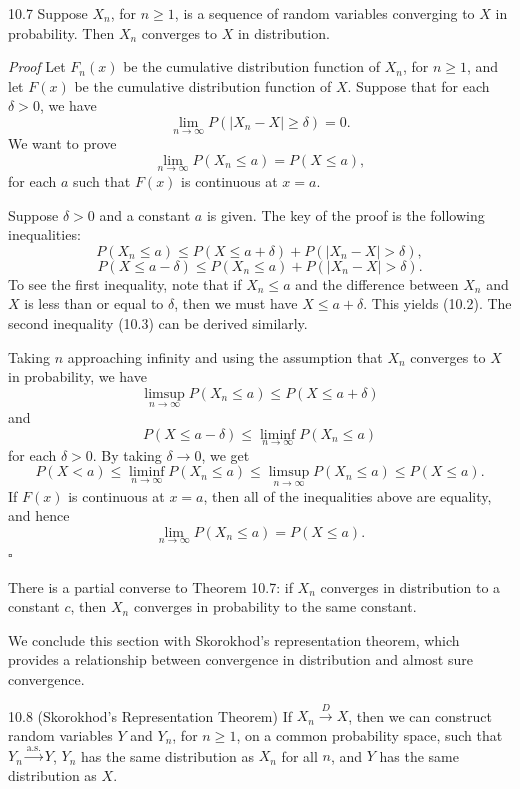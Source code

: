 \begin{thmbox}{10.7}
Suppose $X_n$, for $n\geq 1$, is a sequence of random variables converging to $X$ in probability. Then $X_n$ converges to $X$ in distribution.
\end{thmbox}

\textit{Proof}
Let $F_n(x)$ be the cumulative distribution function of $X_n$, for $n\geq 1$, and let $F(x)$ be the cumulative distribution function of $X$. Suppose that for each $\delta>0$, we have
\[
\lim_{n\to\infty}P(\lvert X_n-X\rvert\geq\delta)=0.
\]
We want to prove
\[
\lim_{n\to\infty}P(X_n\leq a)=P(X\leq a),
\]
for each $a$ such that $F(x)$ is continuous at $x=a$.

Suppose $\delta>0$ and a constant $a$ is given. The key of the proof is the following inequalities:
\[
P(X_n\leq a)\leq P(X\leq a+\delta)+P(\lvert X_n-X\rvert>\delta),
\tag{10.2}
\]
\[
P(X\leq a-\delta)\leq P(X_n\leq a)+P(\lvert X_n-X\rvert>\delta).
\tag{10.3}
\]
To see the first inequality, note that if $X_n\leq a$ and the difference between $X_n$ and $X$ is less than or equal to $\delta$, then we must have $X\leq a+\delta$. This yields (10.2). The second inequality (10.3) can be derived similarly.

Taking $n$ approaching infinity and using the assumption that $X_n$ converges to $X$ in probability, we have
\[
\limsup_{n\to\infty}P(X_n\leq a)\leq P(X\leq a+\delta)
\]
and
\[
P(X\leq a-\delta)\leq \liminf_{n\to\infty}P(X_n\leq a)
\]
for each $\delta>0$. By taking $\delta\to 0$, we get
\[
P(X<a)\leq \liminf_{n\to\infty}P(X_n\leq a)
\leq \limsup_{n\to\infty}P(X_n\leq a)
\leq P(X\leq a).
\]
If $F(x)$ is continuous at $x=a$, then all of the inequalities above are equality, and hence
\[
\lim_{n\to\infty}P(X_n\leq a)=P(X\leq a).
\]
\hfill $\square$

There is a partial converse to Theorem 10.7: if $X_n$ converges in distribution to a constant $c$, then $X_n$ converges in probability to the same constant.

We conclude this section with Skorokhod's representation theorem, which provides a relationship between convergence in distribution and almost sure convergence.

\begin{thmbox}{10.8 (Skorokhod's Representation Theorem)}
If $X_n\xrightarrow{D}X$, then we can construct random variables $Y$ and $Y_n$, for $n\geq 1$, on a common probability space, such that $Y_n\xrightarrow{\mathrm{a.s.}}Y$, $Y_n$ has the same distribution as $X_n$ for all $n$, and $Y$ has the same distribution as $X$.
\end{thmbox}

